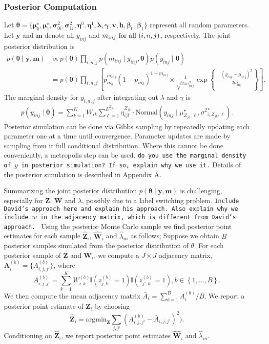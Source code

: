 \documentclass[12pt,]{article}
\newcommand{\bc}[1]{ \left\{#1\right\} }
\newcommand{\N}{ \mathcal{N} }
\def\N{\text{Normal}}
\def\btheta{\bm{\theta}}
\def\y{\bm{y}}
\newcommand\m{\bm{m}}
\def\Z{\bm{Z}}
\begin{document}
\subsubsection{Posterior Computation}\label{sampling-via-mcmc}
Let \(\btheta=\{\bm \mu^\star_0, \bm \mu^\star_1, \bm \sigma^2_{0i}, \bm \sigma^2_{1i}, \bm \eta^0, \bm \eta^1, \bm \lambda, \bm \gamma, \bm v, \bm h, \bm \beta_0, \bm \beta_1\}\) represent all random parameters.  Let \(\y\) and \(\m\) denote all \(y_{inj}\) and \(m_{inj}$ for all \((i,n,j)\), respectively. The joint posterior distribution is 
\begin{align*}
p(\btheta \mid \y, \m) &\propto 
p(\btheta) \prod_{i,n,j} p(m_{inj} \mid y_{inj}, \btheta) p(y_{inj} \mid \btheta) \nonumber\\
&=  
p(\btheta)
\prod_{i,n,j} \left[
  p_{inj}^{m_{inj}} (1-p_{inj})^{1-m_{inj}} \times 
   \frac{1}{\sqrt{2\pi\sigma^2_{inj}}} \exp\bc{-\frac{(y_{inj}-\mu_{inj})^2}{2\sigma^2_{inj}}}
\right].
\end{align*}
The marginal density for \(y_{i,n,j}\) after integrating out
\(\lambda\) and \(\gamma\) is
\begin{align}
p(y_{inj} \mid \btheta) = \sum_{k=1}^K W_{ik} \sum_{\ell=1}^{L^{Z_{jk}}}
\eta^{Z_{jk}}_{ijl} \cdot \N(y_{inj} \mid \mu^\star_{Z_{jk}, \ell}, {\sigma^2}^\star_{i,Z_{jk},\ell}).
\end{align}
Posterior simulation can be done via Gibbs sampling by repeatedly updating each parameter one at a time until convergence. Parameter updates are made by
sampling from it full conditional distribution. Where this cannot be done conveniently, a metropolis step can be used.  {\tt do you use the marginal density of $y$ in posterior simulation?  If so, explain why we use it.}  Details of the posterior simulation is described in Appendix A. 


Summarizing the joint posterior distribution $p(\btheta \mid \y, \m)$ is challenging, especially for $\Z$, $\bm W$ and $\lambda$, possibly due to a label switching problem. {\tt Include David's approach here and explain his approach.  Also explain why we include $w$ in the adjacency matrix, which is different from David's approach. }  Using the posterior Monte Carlo sample we find posterior point estimates for each sample $\hat{\Z}_i$, $\hat{\bm W}_i$ and $\hat{\lambda}_{in}$ as follows; Suppose we obtain \(B\) posterior samples simulated from the posterior distribution of \(\theta\). For each posterior sample of \(\Z\) and \(\bm W_i\), we compute a $J \times J$ adjacency matrix, \(\bm A_i^{(b)} =\{A^{(b)}_{i,j,j'}\}\), where 
\[
A^{(b)}_{i,j,j'} = \sum_{k=1}^K W^{(b)}_{i,k} 
\mathbb{I}\left( z^{(b)}_{j,k} = 1\right)
\mathbb{I}\left(z^{(b)}_{j',k} = 1\right), b \in \bc{1,...,B}.
\]
We then compute the mean adjacency matrix \(\bar A_i = \sum_{b=1}^B A_i^{(b)} / B\).  We report a posterior point estimate of $\Z_i$ by choosing
\[
\hat{\bm Z}_i = \text{argmin}_{\bm Z} \sum_{j,j'} (A_{i,j,j'}^{(b)} - \bar A_{i,j,j'})^2).
\]
Conditioning on $\hat{\Z}_i$, we report posterior point estimates $\hat{\bm W}_i$ and $\hat{\lambda}_{in}$.
\end{document}
